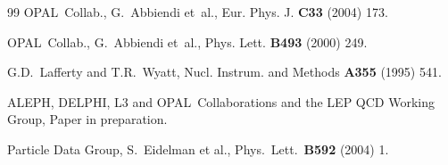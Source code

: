 \documentclass[12pt,a4paper,twoside]{article}
\newcommand{\as}     {\ensuremath{\alpha_{\mathrm{s}}}}
\newcommand{\Opal}{\mbox{\rm OPAL}}
\newcommand{\Aleph}{\mbox{\rm ALEPH}}
\newcommand{\Delphi}{\mbox{\rm DELPHI}}
\newcommand{\Lep}{\mbox{LEP}}
\newcommand{\qcd}{\mbox{QCD}}
\begin{document}
\begin{thebibliography}{99}
\Opal\ Collab., G.~Abbiendi et~al., Eur. Phys. J. {\bf C33} (2004) 173. 

\Opal\ Collab., G.~Abbiendi et~al., Phys. Lett. {\bf B493}  (2000) 249.









G.D.~Lafferty and T.R.~Wyatt, Nucl. Instrum. and  Methods {\bf A355} (1995) 541.

\Aleph, \Delphi, L3 and \Opal\ Collaborations and the LEP QCD Working Group, 
Paper in preparation.

Particle Data Group, S.~Eidelman et al., Phys.\ Lett.\ {\bf B592} (2004) 1.


 

\end{thebibliography}


\clearpage
\end{document}
